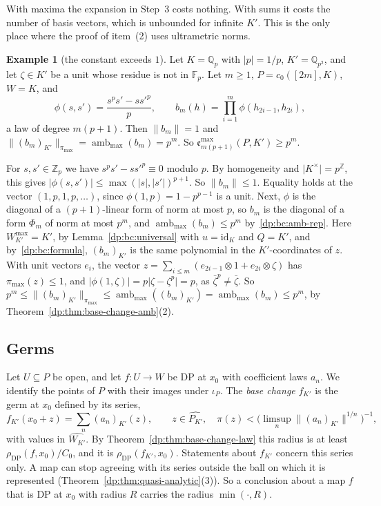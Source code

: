 \documentclass[11pt]{amsart}
\theoremstyle{definition}
\theoremstyle{remark}
\numberwithin{equation}{section}
\newcommand{\Z}{\mathbb Z}
\newcommand{\F}{\mathbb F}
\newcommand{\id}{\mathrm{id}}
\newcommand{\abs}[1]{\lvert #1\rvert}
\newcommand{\norm}[1]{\lVert #1\rVert}
\theoremstyle{plain}
\theoremstyle{definition}
\newtheorem{example}[theorem]{Example}
\theoremstyle{plain}
\begin{document}
With maxima the expansion in Step~3 costs nothing. With sums it costs the number of basis vectors, which is unbounded for infinite $K'$. This is the only place where the proof of item~(2) uses ultrametric norms.

\begin{example}[the constant exceeds $1$]\label{dp:ex:base-law}
Let $K=\mathbb Q_p$ with $\abs p=1/p$, $K'=\mathbb Q_{p^2}$, and let $\zeta\in K'$ be a unit whose residue is not in $\F_p$. Let $m\ge1$, $P=c_0([2m],K)$, $W=K$, and
\[
 \phi(s,s')=\frac{s^ps'-ss'^p}p,\qquad b_m(h)=\prod_{i=1}^m\phi(h_{2i-1},h_{2i}),
\]
a law of degree $m(p+1)$. Then $\norm{b_m}=1$ and $\norm{(b_m)_{K'}}_{\pi_{\max}}=\operatorname{amb}_{\max}(b_m)=p^m$. So $\mathfrak e^{\max}_{m(p+1)}(P,K')\ge p^m$.

For $s,s'\in\mathbb Z_p$ we have $s^ps'-ss'^p\equiv0$ modulo $p$. By homogeneity and $\abs{K^\times}=p^{\Z}$, this gives $\abs{\phi(s,s')}\le\max(\abs s,\abs{s'})^{p+1}$. So $\norm{b_m}\le1$. Equality holds at the vector $(1,p,1,p,\dots)$, since $\phi(1,p)=1-p^{p-1}$ is a unit. Next, $\phi$ is the diagonal of a $(p+1)$-linear form of norm at most $p$, so $b_m$ is the diagonal of a form $\Phi_m$ of norm at most $p^m$, and $\operatorname{amb}_{\max}(b_m)\le p^m$ by~\eqref{dp:bc:amb-rep}. Here $W^{\max}_{K'}=K'$, by Lemma~\ref{dp:bc:universal} with $u=\id_K$ and $Q=K'$, and by~\eqref{dp:bc:formula}, $(b_m)_{K'}$ is the same polynomial in the $K'$-coordinates of $z$. With unit vectors $e_i$, the vector $z=\sum_{i\le m}(e_{2i-1}\otimes1+e_{2i}\otimes\zeta)$ has $\pi_{\max}(z)\le1$, and $\abs{\phi(1,\zeta)}=p\abs{\zeta-\zeta^p}=p$, as $\bar\zeta^p\ne\bar\zeta$. So $p^m\le\norm{(b_m)_{K'}}_{\pi_{\max}}\le\operatorname{amb}_{\max}((b_m)_{K'})=\operatorname{amb}_{\max}(b_m)\le p^m$, by Theorem~\ref{dp:thm:base-change-amb}(2).
\end{example}

\subsection{Germs}

Let $U\subseteq P$ be open, and let $f\colon U\to W$ be DP at $x_0$ with coefficient laws $a_n$. We identify the points of $P$ with their images under $\iota_P$. The \emph{base change} $f_{K'}$ is the germ at $x_0$ defined by its series,
\[
 f_{K'}(x_0+z)=\sum_n(a_n)_{K'}(z),\qquad z\in\widehat{P_{K'}},\quad\pi(z)<\bigl(\limsup_n\norm{(a_n)_{K'}}^{1/n}\bigr)^{-1},
\]
with values in $\widehat{W_{K'}}$. By Theorem~\ref{dp:thm:base-change-law} this radius is at least $\rho_{\mathrm{DP}}(f,x_0)/C_0$, and it is $\rho_{\mathrm{DP}}(f_{K'},x_0)$. Statements about $f_{K'}$ concern this series only. A map can stop agreeing with its series outside the ball on which it is represented (Theorem~\ref{dp:thm:quasi-analytic}(3)). So a conclusion about a map $f$ that is DP at $x_0$ with radius $R$ carries the radius $\min(\cdot,R)$.
\end{document}
